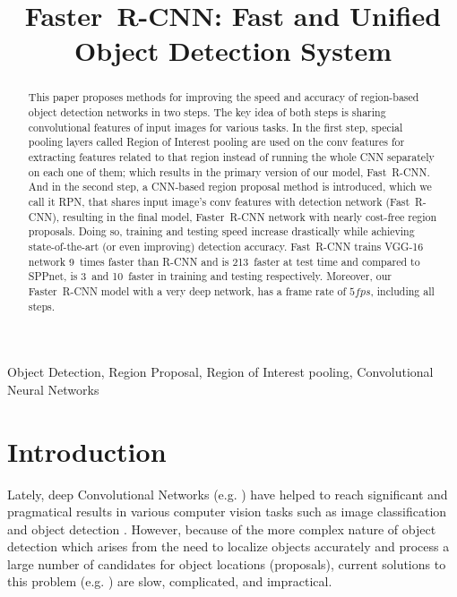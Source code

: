 \documentclass[conference]{IEEEtran}
\newcommand{\fast}[0]{\mbox{Fast~R-CNN}}
\newcommand{\faster}[0]{\mbox{Faster~R-CNN}}
\begin{document}
\title{\faster{}: Fast and Unified \\Object Detection System}

\author{
}

\maketitle

\begin{abstract}
This paper proposes methods for improving the speed and accuracy of region-based object detection networks in two steps.
The key idea of both steps is sharing convolutional features of input images for various tasks.
In the first step, special pooling layers called Region of Interest pooling are used on the conv features for extracting features related to that region instead of running the whole CNN separately on each one of them; which results in the primary version of our model, \fast{}.
And in the second step, a CNN-based region proposal method is introduced, which we call 
it RPN, that shares input image's conv features with detection network (\fast{}), resulting in the final model, \faster{} network with nearly cost-free region proposals. Doing so, training and testing speed increase drastically while achieving state-of-the-art (or even improving) detection accuracy.
\fast{} trains VGG-16 network 9\texttimes\ times faster than R-CNN and is 213\texttimes\ faster at test time and compared to SPPnet, is 3\texttimes\ and 10\texttimes\ faster in training and testing respectively.
Moreover, our \faster{} model with a very deep network, has a frame rate of $5fps$, including all steps.
\end{abstract}

\begin{IEEEkeywords}
Object Detection, Region Proposal, Region of Interest pooling, Convolutional Neural Networks
\end{IEEEkeywords}

\section{Introduction}
Lately, deep Convolutional Networks (e.g. \cite{a14}) have helped to reach significant and pragmatical results in various computer vision tasks such as image classification \cite{a14} and object detection \cite{a9, a19}. However, because of the more complex nature of object detection 
which arises from the need to localize objects accurately and process a large number of candidates for object locations (proposals), current solutions to this problem (e.g. \cite{a9, a12, a19}) are slow, complicated, and impractical.
\end{document}
